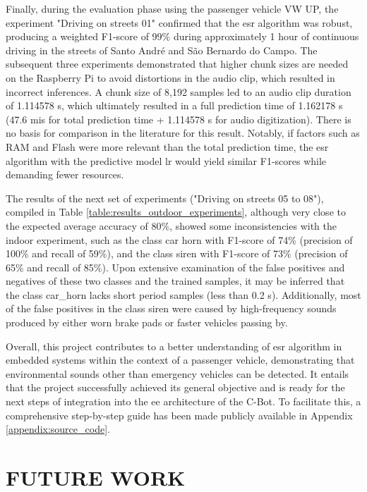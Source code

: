 Finally, during the evaluation phase using the passenger vehicle VW UP, the experiment "Driving on streets 01" confirmed that the \gls{esr} algorithm was robust, producing a weighted F1-score of 99\% during approximately 1 hour of continuous driving in the streets of Santo André and São Bernardo do Campo. The subsequent three experiments demonstrated that higher chunk sizes are needed on the Raspberry Pi to avoid distortions in the audio clip, which resulted in incorrect inferences. A chunk size of 8,192 samples led to an audio clip duration of 1.114578 \gls{s}, which ultimately resulted in a full prediction time of 1.162178 \gls{s} (47.6 \gls{mi}\gls{s} for total prediction time + 1.114578 \gls{s} for audio digitization). There is no basis for comparison in the literature for this result. Notably, if factors such as RAM and Flash were more relevant than the total prediction time, the \gls{esr} algorithm with the predictive model \gls{lr} would yield similar F1-scores while demanding fewer resources.

The results of the next set of experiments ("Driving on streets 05 to 08"), compiled in Table \ref{table:results_outdoor_experiments}, although very close to the expected average accuracy of 80\%, showed some inconsistencies with the indoor experiment, such as the class car horn with F1-score of 74\% (precision of 100\% and recall of 59\%), and the class siren with F1-score of 73\% (precision of 65\% and recall of 85\%). Upon extensive examination of the false positives and negatives of these two classes and the trained samples, it may be inferred that the class car\_horn lacks short period samples (less than 0.2 \gls{s}). Additionally, most of the false positives in the class siren were caused by high-frequency sounds produced by either worn brake pads or faster vehicles passing by.

Overall, this project contributes to a better understanding of \gls{esr} algorithm in embedded systems within the context of a passenger vehicle, demonstrating that environmental sounds other than emergency vehicles can be detected. It entails that the project successfully achieved its general objective and is ready for the next steps of integration into the \gls{ee} architecture of the C-Bot. To facilitate this, a comprehensive step-by-step guide has been made publicly available in Appendix \ref{appendix:source_code}.


\section{FUTURE WORK}
\label{sec:results_future_work}

